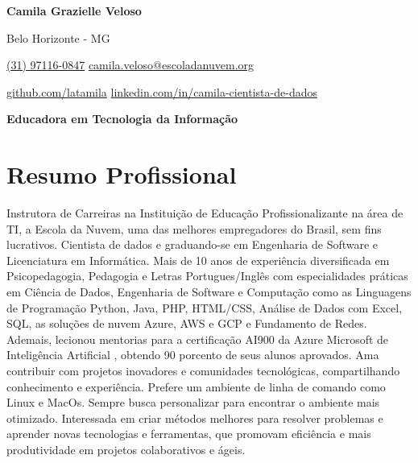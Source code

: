 \documentclass[a4paper,10pt]{article}
\begin{document}

\noindent
\begin{minipage}[t]{0.5\textwidth}
\textbf{\Large Camila Grazielle Veloso}

\vspace{0.4em}

\end{minipage}%
\begin{minipage}[t]{0.5\textwidth}
\raggedleft

Belo Horizonte - MG

{\color{blue}} \href{tel:+5567998748431}{(31) 97116-0847}
{\color{blue}} \href{mailto:camila.veloso@escoladanuvem.org}{camila.veloso@escoladanuvem.org}

\vspace{0.2em}
 \quad
{\color{blue}} \href{https://github.com/latamila}{github.com/latamila}
{\color{blue}} \href{https://www.linkedin.com/in/camila-cientista-de-dados/}{ linkedin.com/in/camila-cientista-de-dados} \\
\end{minipage}

\vspace{1em}

\begin{center}
    \textbf{\Large Educadora em Tecnologia da Informação}
\end{center}
\vspace{0.5em}

\section*{Resumo Profissional}

\vspace{0.6em}

Instrutora de Carreiras na Instituição de Educação Profissionalizante na área de TI, a Escola da Nuvem, uma das melhores empregadores do Brasil, sem fins lucrativos. Cientista de dados e graduando-se em Engenharia de Software e Licenciatura em Informática. Mais de 10 anos de experiência diversificada em Psicopedagogia, Pedagogia e Letras Portugues/Inglês com especialidades práticas em Ciência de Dados, Engenharia de Software e Computação como as Linguagens de Programação Python, Java, PHP, HTML/CSS, Análise de Dados com Excel, SQL, as soluções de nuvem Azure, AWS e GCP e Fundamento de Redes. Ademais, lecionou mentorias para a certificação AI900 da Azure Microsoft de Inteligência Artificial , obtendo 90 porcento de seus alunos aprovados. Ama contribuir com projetos inovadores e comunidades tecnológicas, compartilhando conhecimento e experiência. Prefere um ambiente de linha de comando como Linux e MacOs. Sempre busca personalizar para encontrar o ambiente mais otimizado. Interessada em criar métodos melhores para resolver problemas e aprender novas tecnologias e ferramentas, que promovam eficiência e mais produtividade em projetos colaborativos e ágeis. 
\end{document}
